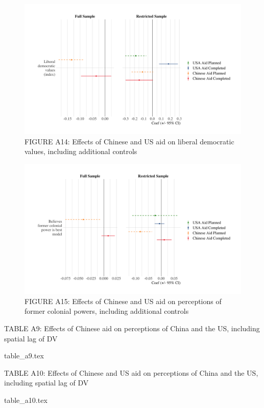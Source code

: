 \documentclass[9pt]{article}
\begin{document}
\begin{figure}[H]
\centering
\includegraphics[width=1\textwidth]{figures/figure_a14.png}
\caption{FIGURE A14: Effects of Chinese and US aid on liberal democratic values, including additional controls}
\end{figure}

\begin{figure}[H]
\centering
\includegraphics[width=1\textwidth]{figures/figure_a15.png}
\caption{FIGURE A15: Effects of Chinese and US aid on perceptions of former colonial powers, including additional controls}
\end{figure}

\newpage %

\setlength{\tabcolsep}{5pt}
\begin{table}[H]
\caption{TABLE A9: Effects of Chinese aid on perceptions of China and the US, including spatial lag of DV}
\label{reg}
\centering
{table_a9.tex}
\end{table}

\setlength{\tabcolsep}{5pt}
\begin{table}[H]
\caption{TABLE A10: Effects of Chinese and US aid on perceptions of China and the US, including spatial lag of DV}
\label{reg}
\centering
{table_a10.tex}
\end{table}
\end{document}
